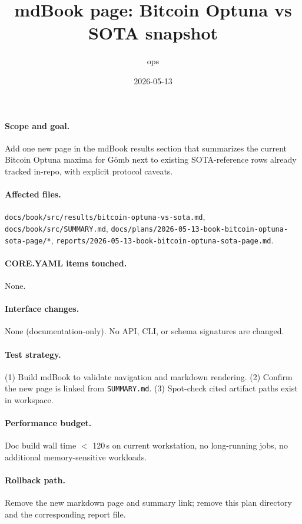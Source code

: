 \documentclass{article}
\title{mdBook page: Bitcoin Optuna vs SOTA snapshot}
\author{ops}
\date{2026-05-13}
\begin{document}
\maketitle

\paragraph{Scope and goal.}
Add one new page in the mdBook results section that summarizes the current
Bitcoin Optuna maxima for G\"omb next to existing SOTA-reference rows already
tracked in-repo, with explicit protocol caveats.

\paragraph{Affected files.}
\texttt{docs/book/src/results/bitcoin-optuna-vs-sota.md},
\texttt{docs/book/src/SUMMARY.md},
\texttt{docs/plans/2026-05-13-book-bitcoin-optuna-sota-page/*},
\texttt{reports/2026-05-13-book-bitcoin-optuna-sota-page.md}.

\paragraph{CORE.YAML items touched.}
None.

\paragraph{Interface changes.}
None (documentation-only). No API, CLI, or schema signatures are changed.

\paragraph{Test strategy.}
(1) Build mdBook to validate navigation and markdown rendering.
(2) Confirm the new page is linked from \texttt{SUMMARY.md}.
(3) Spot-check cited artifact paths exist in workspace.

\paragraph{Performance budget.}
Doc build wall time $<$ 120\,s on current workstation, no long-running jobs,
no additional memory-sensitive workloads.

\paragraph{Rollback path.}
Remove the new markdown page and summary link; remove this plan directory and
the corresponding report file.
\end{document}
